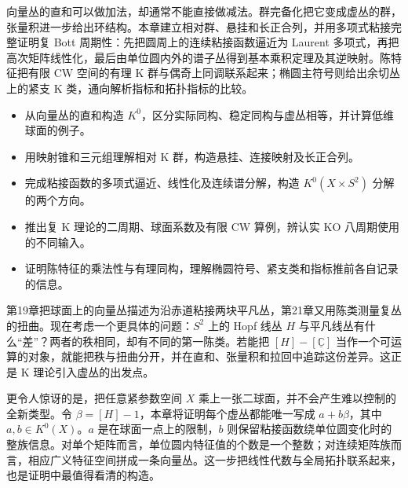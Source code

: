 
% 
% 


\begin{chapterabstract}
	向量丛的直和可以做加法，却通常不能直接做减法。群完备化把它变成虚丛的群，张量积进一步给出环结构。本章建立相对群、悬挂和长正合列，并用多项式粘接完整证明复 Bott 周期性：先把圆周上的连续粘接函数逼近为 Laurent 多项式，再把高次矩阵线性化，最后由单位圆内外的谱子丛得到基本乘积定理及其逆映射。陈特征把有限 CW 空间的有理 K 群与偶奇上同调联系起来；椭圆主符号则给出余切丛上的紧支 K 类，通向解析指标和拓扑指标的比较。
\end{chapterabstract}

\begin{learninggoals}
	\begin{itemize}
		\item 从向量丛的直和构造 \(K^0\)，区分实际同构、稳定同构与虚丛相等，并计算低维球面的例子。
		\item 用映射锥和三元组理解相对 K 群，构造悬挂、连接映射及长正合列。
		\item 完成粘接函数的多项式逼近、线性化及连续谱分解，构造 \(K^0(X\times S^2)\) 分解的两个方向。
		\item 推出复 K 理论的二周期、球面系数及有限 CW 算例，辨认实 KO 八周期使用的不同输入。
		\item 证明陈特征的乘法性与有理同构，理解椭圆符号、紧支类和指标推前各自记录的信息。
	\end{itemize}
\end{learninggoals}

第19章把球面上的向量丛描述为沿赤道粘接两块平凡丛，第21章又用陈类测量复丛的扭曲。现在考虑一个更具体的问题：\(S^2\) 上的 Hopf 线丛 \(H\) 与平凡线丛有什么“差”？两者的秩相同，却有不同的第一陈类。若能把 \([H]-[\underline{\mathbb C}]\) 当作一个可运算的对象，就能把秩与扭曲分开，并在直和、张量积和拉回中追踪这份差异。这正是 K 理论引入虚丛的出发点。

\ProseParagraphBreak

更令人惊讶的是，把任意紧参数空间 \(X\) 乘上一张二球面，并不会产生难以控制的全新类型。令 \(\beta=[H]-1\)，本章将证明每个虚丛都能唯一写成 \(a+b\beta\)，其中 \(a,b\in K^0(X)\)。\(a\) 是在球面一点上的限制，\(b\) 则保留粘接函数绕单位圆变化时的整族信息。对单个矩阵而言，单位圆内特征值的个数是一个整数；对连续矩阵族而言，相应广义特征空间拼成一条向量丛。这一步把线性代数与全局拓扑联系起来，也是证明中最值得看清的构造。

